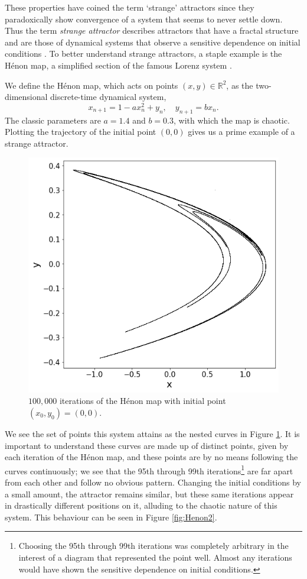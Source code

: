 These properties have coined the term `strange' attractors since they paradoxically show convergence of a system that seems to never settle down. Thus the term \emph{strange attractor} describes attractors that have a fractal structure and are those of dynamical systems that observe a sensitive dependence on initial conditions \cite{feldman2012chaos}. To better understand strange attractors, a staple example is the Hénon map, a simplified section of the famous Lorenz system \cite{nonlinear_system}.
\begin{exmp}
    We define the Hénon map, which acts on points $(x,y)\in \mathbb{R}^2$, as the two-dimensional discrete-time dynamical system,
\begin{equation}
    x_{n+1} = 1 - a x_n^2 + y_n, \quad y_{n+1} = b x_n.   
\end{equation}\label{Henonequation}
The classic parameters are $a=1.4$ and $b=0.3$, with which the map is chaotic. Plotting the trajectory of the initial point $(0,0)$ gives us a prime example of a strange attractor.
    \begin{figure}
        \centering
        \includegraphics[width=0.4\linewidth]{Images/Henon attractor.png}
        \caption{$100,000$ iterations of the Hénon map with initial point $(x_0, y_0)=(0,0)$.}
        \label{fig:Henon1}
    \end{figure}
    We see the set of points this system attains as the nested curves in Figure \ref{fig:Henon1}. It is important to understand these curves are made up of distinct points, given by each iteration of the Hénon map, and these points are by no means following the curves continuously; we see that the 95th through 99th iterations\footnote{Choosing the 95th through 99th iterations was completely arbitrary in the interest of a diagram that represented the point well. Almost any iterations would have shown the sensitive dependence on initial conditions.} are far apart from each other and follow no obvious pattern. Changing the initial conditions by a small amount, the attractor remains similar, but these same iterations appear in drastically different positions on it, alluding to the chaotic nature of this system. This behaviour can be seen in Figure \ref{fig:Henon2}.

\end{exmp}
